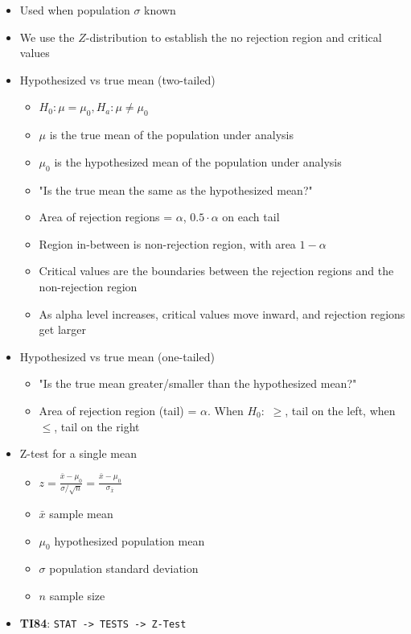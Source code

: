 \documentclass{article}
\newcommand{\code}[1]{\colorbox{light-gray}{\texttt{#1}}}
\begin{document}
\begin{itemize}
    \item Used when population $\sigma$ known
    \item We use the $Z$-distribution to establish the no rejection region and critical values
    \item Hypothesized vs true mean (two-tailed)
    \begin{itemize}
        \item $H_0: \mu = \mu_0, H_a: \mu \ne \mu_0$
        \item $\mu$ is the true mean of the population under analysis
        \item $\mu_0$ is the hypothesized mean of the population under analysis
        \item "Is the true mean the same as the hypothesized mean?"
        \item Area of rejection regions = $\alpha$, $0.5 \cdot \alpha$ on each tail
        \item Region in-between is non-rejection region, with area $1-\alpha$
        \item Critical values are the boundaries between the rejection regions and the non-rejection region
        \item As alpha level increases, critical values move inward, and rejection regions get larger
    \end{itemize}
    \item Hypothesized vs true mean (one-tailed)
    \begin{itemize}
        \item "Is the true mean greater/smaller than the hypothesized mean?"
        \item Area of rejection region (tail) = $\alpha$. When $H_0:$ $\geq$, tail on the left, when $\leq$, tail on the right
    \end{itemize}
    \item Z-test for a single mean
    \begin{itemize}
        \item $z=\frac{\bar{x} - \mu_0}{\sigma / \sqrt{n}}=\frac{\bar{x} - \mu_0}{\sigma_{\bar{x}}}$
        \item $\bar{x}$ sample mean
        \item $\mu_0$ hypothesized population mean
        \item $\sigma$ population standard deviation
        \item $n$ sample size
    \end{itemize}
    \item \textbf{TI84}: \code{STAT -> TESTS -> Z-Test}
\end{itemize}
\end{document}
